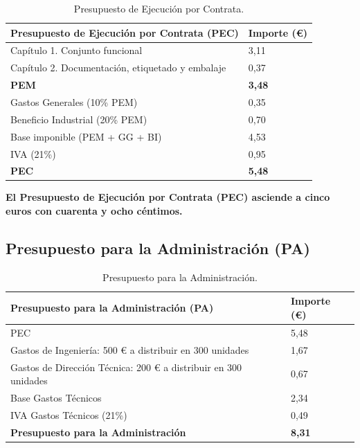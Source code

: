 \documentclass[11pt,a4paper]{article}
\begin{document}
\begin{table}[htbp]
\centering
\footnotesize
\renewcommand{\arraystretch}{1.35}
\begin{tabular}{|p{11.0cm}|p{3.0cm}|}
\hline
\rowcolor{ArthroTeal}
\textbf{\color{white}Presupuesto de Ejecución por Contrata (PEC)} & \textbf{\color{white}Importe (€)} \\
\hline
Capítulo 1. Conjunto funcional & 3,11 \\
\hline
Capítulo 2. Documentación, etiquetado y embalaje & 0,37 \\
\hline
\textbf{PEM} & \textbf{3,48} \\
\hline
Gastos Generales (10\% PEM) & 0,35 \\
\hline
Beneficio Industrial (20\% PEM) & 0,70 \\
\hline
Base imponible (PEM + GG + BI) & 4,53 \\
\hline
IVA (21\%) & 0,95 \\
\hline
\rowcolor{gray!15}
\textbf{PEC} & \textbf{5,48} \\
\hline
\end{tabular}
\caption{Presupuesto de Ejecución por Contrata.}
\label{tab:pec}
\end{table}

\noindent\textbf{El Presupuesto de Ejecución por Contrata (PEC) asciende a cinco euros con cuarenta y ocho céntimos.}

\subsection{Presupuesto para la Administración (PA)}

\begin{table}[htbp]
\centering
\footnotesize
\renewcommand{\arraystretch}{1.35}
\begin{tabular}{|p{11.0cm}|p{3.0cm}|}
\hline
\rowcolor{ArthroTeal}
\textbf{\color{white}Presupuesto para la Administración (PA)} & \textbf{\color{white}Importe (€)} \\
\hline
PEC & 5,48 \\
\hline
Gastos de Ingeniería: 500 € a distribuir en 300 unidades & 1,67 \\
\hline
Gastos de Dirección Técnica: 200 € a distribuir en 300 unidades & 0,67 \\
\hline
Base Gastos Técnicos & 2,34 \\
\hline
IVA Gastos Técnicos (21\%) & 0,49 \\
\hline
\rowcolor{gray!15}
\textbf{Presupuesto para la Administración} & \textbf{8,31} \\
\hline
\end{tabular}
\caption{Presupuesto para la Administración.}
\label{tab:pa}
\end{table}
\end{document}

